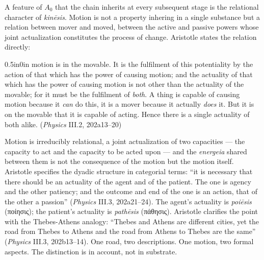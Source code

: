 \documentclass{article}
\newcommand{\gk}[1]{{\greekfont #1}}
\begin{document}
A feature of $A_0$ that the chain inherits at every subsequent stage is the relational character of \textit{kinēsis}. Motion is not a property inhering in a single substance but a relation between mover and moved, between the active and passive powers whose joint actualization constitutes the process of change. Aristotle states the relation directly:
\begin{adjustwidth}{0.5in}{0in}
motion is in the movable. It is the fulfilment of this potentiality by the action of that which has the power of causing motion; and the actuality of that which has the power of causing motion is not other than the actuality of the movable; for it must be the fulfilment of \textit{both}. A thing is capable of causing motion because it \textit{can} do this, it is a mover because it actually \textit{does} it. But it is on the movable that it is capable of acting. Hence there is a single actuality of both alike. (\textit{Physics} III.2, 202a13--20)
\end{adjustwidth}
Motion is irreducibly relational, a joint actualization of two capacities --- the capacity to act and the capacity to be acted upon --- and the \textit{energeia} shared between them is not the consequence of the motion but the motion itself. Aristotle specifies the dyadic structure in categorial terms: ``it is necessary that there should be an actuality of the agent and of the patient. The one is agency and the other patiency; and the outcome and end of the one is an action, that of the other a passion'' (\textit{Physics} III.3, 202a21--24). The agent's actuality is \textit{poiēsis} (\gk{ποίησις}); the patient's actuality is \textit{pathēsis} (\gk{πάθησις}). Aristotle clarifies the point with the Thebes-Athens analogy: ``Thebes and Athens are different cities, yet the road from Thebes to Athens and the road from Athens to Thebes are the same'' (\textit{Physics} III.3, 202b13--14). One road, two descriptions. One motion, two formal aspects. The distinction is in account, not in substrate.
\end{document}

